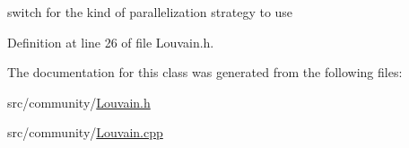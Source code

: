 switch for the kind of parallelization strategy to use 



Definition at line 26 of file Louvain.\-h.



The documentation for this class was generated from the following files\-:\begin{DoxyCompactItemize}
\item 
src/community/\hyperlink{_louvain_8h}{Louvain.\-h}\item 
src/community/\hyperlink{_louvain_8cpp}{Louvain.\-cpp}\end{DoxyCompactItemize}
